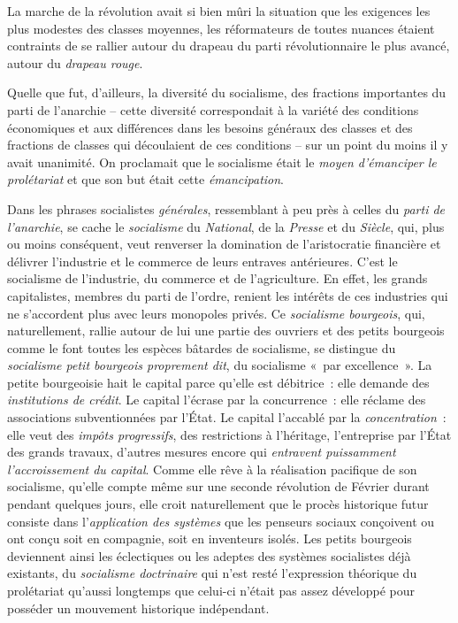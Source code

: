 \documentclass[twoside]{book} %
\begin{document}
La marche de la révolution avait si bien mûri la situation que les exigences les plus modestes des classes moyennes, les réformateurs de toutes nuances étaient contraints de se rallier autour du drapeau du parti révolutionnaire le plus avancé, autour du \emph{drapeau rouge}.\par
Quelle que fut, d’ailleurs, la diversité du socialisme, des fractions importantes du parti de l’anarchie – cette diversité correspondait à la variété des conditions économiques et aux différences dans les besoins généraux des classes et des fractions de classes qui découlaient de ces conditions – sur un point du moins il y avait unanimité. On proclamait que le socialisme était le \emph{moyen d’émanciper le prolétariat} et que son but était cette \emph{émancipation}.\par
Dans les phrases socialistes \emph{générales}, ressemblant à peu près à celles du \emph{parti de l’anarchie}, se cache le \emph{socialisme} du \emph{National}, de la \emph{Presse} et du \emph{Siècle}, qui, plus ou moins conséquent, veut renverser la domination de l’aristocratie financière et délivrer l’industrie et le commerce de leurs entraves antérieures. C’est le socialisme de l’industrie, du commerce et de l’agriculture. En effet, les grands capitalistes, membres du parti de l’ordre, renient les intérêts de ces industries qui ne s’accordent plus avec leurs monopoles privés. Ce \emph{socialisme bourgeois}, qui, naturellement, rallie autour de lui une partie des ouvriers et des petits bourgeois comme le font toutes les espèces bâtardes de socialisme, se distingue du \emph{socialisme petit bourgeois proprement dit}, du socialisme « par excellence ». La petite bourgeoisie hait le capital parce qu’elle est débitrice : elle demande des \emph{institutions de crédit}. Le capital l’écrase par la concurrence : elle réclame des associations subventionnées par l’État. Le capital l’accablé par la \emph{concentration} : elle veut des \emph{impôts progressifs}, des restrictions à l’héritage, l’entreprise par l’État des grands travaux, d’autres mesures encore qui \emph{entravent puissamment l’accroissement du capital}. Comme elle rêve à la réalisation pacifique de son socialisme, qu’elle compte même sur une seconde révolution de Février durant pendant quelques jours, elle croit naturellement que le procès historique futur consiste dans l’\emph{application des systèmes} que les penseurs sociaux conçoivent ou ont conçu soit en compagnie, soit en inventeurs isolés. Les petits bourgeois deviennent ainsi les éclectiques ou les adeptes des systèmes socialistes déjà existants, du \emph{socialisme doctrinaire} qui n’est resté l’expression théorique du prolétariat qu’aussi longtemps que celui-ci n’était pas assez développé pour posséder un mouvement historique indépendant.\par
\end{document}
